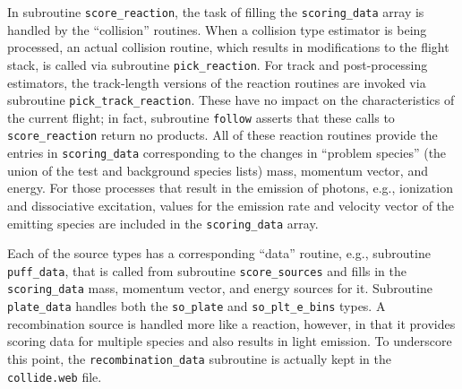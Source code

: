 \documentclass[12pt]{report}
\def\href#1#2{\special{html:<a href="#1">}{#2}\special{html:</a>}}
\begin{document}

In subroutine {\tt score\_reaction}, the
task of filling the {\tt scoring\_data}
array is handled by the ``collision'' routines.
When a collision type estimator is being processed,
an actual collision routine, which results
in modifications to the flight stack,
is called via subroutine {\tt pick\_reaction}.
For track and post-processing estimators,
the track-length versions of the reaction
routines are invoked via subroutine
{\tt pick\_track\_reaction}.  These have
no impact on the characteristics of the
current flight; in fact, subroutine {\tt follow}
asserts that these calls to {\tt score\_reaction}
return no products.
All of these reaction routines provide
the entries in
{\tt scoring\_data} corresponding to 
the changes in ``problem
species'' (the union of the test and background
species lists) mass, momentum vector, and
energy.
For those processes that result in the emission
of photons, e.g., ionization
and dissociative excitation, values for
the emission rate and velocity vector of the
emitting species are included in the {\tt scoring\_data}
array.

Each of the source types has a corresponding
``data'' routine, e.g., subroutine
{\tt puff\_data}, that is called from
subroutine {\tt score\_sources} and fills in the
{\tt scoring\_data} mass,
momentum vector, and energy sources
for it. Subroutine {\tt plate\_data} handles
both the {\tt so\_plate} and {\tt so\_plt\_e\_bins}
types.  A recombination source is handled more
like a reaction, however, in that it provides
scoring data for multiple species and also results
in light emission.  To underscore this point, the
{\tt recombination\_data} subroutine is actually
kept in the {\tt collide.web} file.
\end{document}
